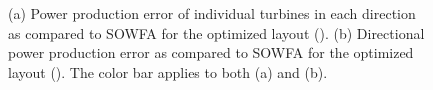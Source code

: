 \documentclass[conf]{new-aiaa}
\begin{document}
\begin{figure}[htpb!]
	\centering
	\caption{(a) Power production error of individual turbines in each direction as compared to SOWFA for the optimized layout (). (b) Directional power production error as compared to SOWFA for the optimized layout ().  The color bar applies to both (a) and (b).}
	\label{fig:optimized-power-error}
\end{figure}

\clearpage 


\end{document}
